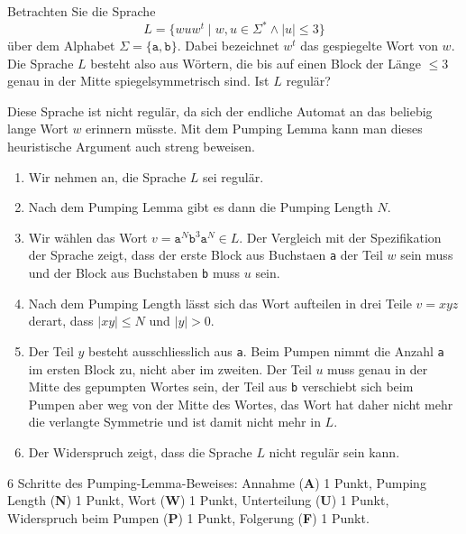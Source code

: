 Betrachten Sie die Sprache
\[
L
=
\{
wuw^t
\mid
w,u\in\Sigma^*\wedge |u|\le 3
\}
\]
über dem Alphabet $\Sigma=\{\texttt{a},\texttt{b}\}$.
Dabei bezeichnet $w^t$ das gespiegelte Wort von $w$.
Die Sprache $L$ besteht also aus Wörtern, die bis auf einen Block
der Länge $\le 3$ genau in der Mitte spiegelsymmetrisch sind.
Ist $L$ regulär?


\begin{loesung}
Diese Sprache ist nicht regulär, da sich der endliche Automat an das
beliebig lange Wort $w$ erinnern müsste.
Mit dem Pumping Lemma kann man dieses heuristische Argument auch streng
beweisen.
\begin{enumerate}
\item
Wir nehmen an, die Sprache $L$ sei regulär.
\item
Nach dem Pumping Lemma gibt es dann die Pumping Length $N$.
\item
Wir wählen das Wort
$v=\texttt{a}^N\texttt{b}^3\texttt{a}^N\in L$.
Der Vergleich mit der Spezifikation der Sprache zeigt, dass der erste
Block aus Buchstaen \texttt{a} der Teil $w$ sein muss und der Block aus 
Buchstaben \texttt{b} muss $u$ sein.
\item
Nach dem Pumping Length lässt sich das Wort aufteilen in drei Teile
$v=xyz$ derart, dass $|xy|\le N$ und $|y|>0$.
\item
Der Teil $y$ besteht ausschliesslich aus \texttt{a}.
Beim Pumpen nimmt die Anzahl \texttt{a} im ersten Block zu, nicht
aber im zweiten.
Der Teil $u$ muss genau in der Mitte des gepumpten Wortes sein,
der Teil aus \texttt{b} verschiebt sich beim Pumpen aber weg von
der Mitte des Wortes, das Wort hat daher nicht mehr die verlangte
Symmetrie und ist damit nicht mehr in $L$.
\item
Der Widerspruch zeigt, dass die Sprache $L$ nicht regulär sein kann.
\qedhere
\end{enumerate}
\end{loesung}

\begin{bewertung}
6 Schritte des Pumping-Lemma-Beweises:
Annahme ({\bf A}) 1 Punkt,
Pumping Length ({\bf N}) 1 Punkt,
Wort ({\bf W}) 1 Punkt,
Unterteilung ({\bf U}) 1 Punkt,
Widerspruch beim Pumpen ({\bf P}) 1 Punkt,
Folgerung ({\bf F}) 1 Punkt.
\end{bewertung}

